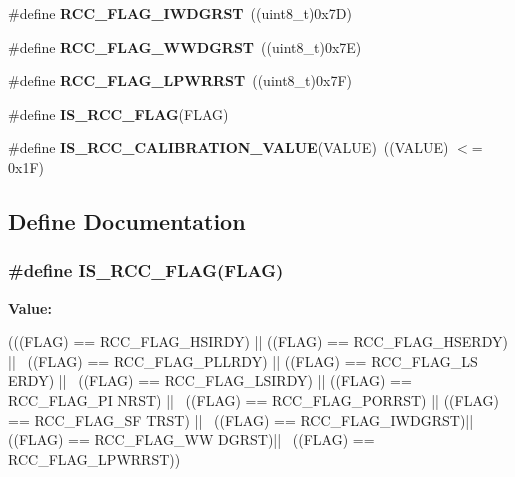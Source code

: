 \begin{DoxyCompactItemize}
\item 
\hypertarget{group__RCC__Flag_gaac46bac8a97cf16635ff7ffc1e6c657f}{
\#define {\bfseries RCC\_\-FLAG\_\-IWDGRST}~((uint8\_\-t)0x7D)}
\label{group__RCC__Flag_gaac46bac8a97cf16635ff7ffc1e6c657f}

\item 
\hypertarget{group__RCC__Flag_gaa80b60b2d497ccd7b7de1075009999a7}{
\#define {\bfseries RCC\_\-FLAG\_\-WWDGRST}~((uint8\_\-t)0x7E)}
\label{group__RCC__Flag_gaa80b60b2d497ccd7b7de1075009999a7}

\item 
\hypertarget{group__RCC__Flag_ga67049531354aed7546971163d02c9920}{
\#define {\bfseries RCC\_\-FLAG\_\-LPWRRST}~((uint8\_\-t)0x7F)}
\label{group__RCC__Flag_ga67049531354aed7546971163d02c9920}

\item 
\#define {\bfseries IS\_\-RCC\_\-FLAG}(FLAG)
\item 
\hypertarget{group__RCC__Flag_gafda50a08dc048f7c272bf04ec9c2c2b7}{
\#define {\bfseries IS\_\-RCC\_\-CALIBRATION\_\-VALUE}(VALUE)~((VALUE) $<$= 0x1F)}
\label{group__RCC__Flag_gafda50a08dc048f7c272bf04ec9c2c2b7}

\end{DoxyCompactItemize}


\subsection{Define Documentation}
\hypertarget{group__RCC__Flag_gaa27dea5bb62b26d0881e649770252158}{
\subsubsection[{IS\_\-RCC\_\-FLAG}]{\setlength{\rightskip}{0pt plus 5cm}\#define IS\_\-RCC\_\-FLAG(FLAG)}}
\label{group__RCC__Flag_gaa27dea5bb62b26d0881e649770252158}
{\bfseries Value:}
\begin{DoxyCode}
(((FLAG) == RCC_FLAG_HSIRDY) || ((FLAG) == RCC_FLAG_HSERDY) || \
                            ((FLAG) == RCC_FLAG_PLLRDY) || ((FLAG) == RCC_FLAG_LS
      ERDY) || \
                            ((FLAG) == RCC_FLAG_LSIRDY) || ((FLAG) == RCC_FLAG_PI
      NRST) || \
                            ((FLAG) == RCC_FLAG_PORRST) || ((FLAG) == RCC_FLAG_SF
      TRST) || \
                            ((FLAG) == RCC_FLAG_IWDGRST)|| ((FLAG) == RCC_FLAG_WW
      DGRST)|| \
                            ((FLAG) == RCC_FLAG_LPWRRST))
\end{DoxyCode}
